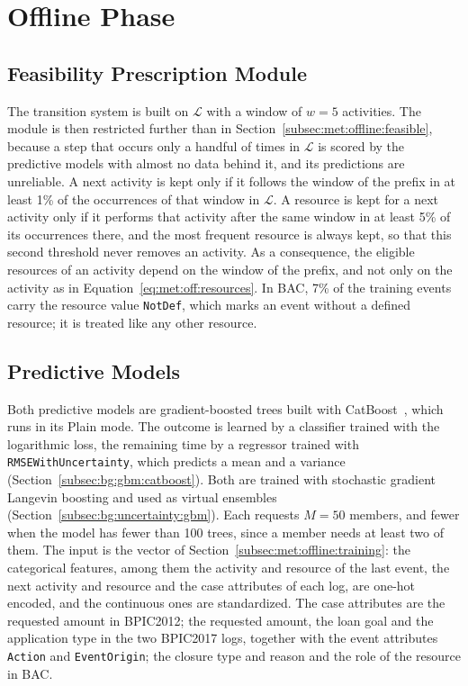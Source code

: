 \section{Offline Phase}
\label{sec:ev:offline}

\subsection{Feasibility Prescription Module}
\label{subsec:ev:off:feasible}
The transition system is built on $\mathcal{L}$ with a window of $w = 5$
activities. The module is then restricted further than in
Section~\ref{subsec:met:offline:feasible}, because a step that occurs only a
handful of times in $\mathcal{L}$ is scored by the predictive models with
almost no data behind it, and its predictions are unreliable. A next
activity is kept only if it follows the window of the prefix in at least 1\%
of the occurrences of that window in $\mathcal{L}$. A resource is kept for a
next activity only if it performs that activity after the same window in at
least 5\% of its occurrences there, and the most frequent resource is always
kept, so that this second threshold never removes an activity. As a
consequence, the eligible resources of an activity depend on the window of
the prefix, and not only on the activity as in
Equation~\eqref{eq:met:off:resources}. In BAC, 7\% of the training events
carry the resource value \texttt{NotDef}, which marks an event without a
defined resource; it is treated like any other resource.

\subsection{Predictive Models}
\label{subsec:ev:off:models}
Both predictive models are gradient-boosted trees built with
CatBoost~\cite{prokhorenkova2018}, which runs in its Plain mode. The outcome
is learned by a classifier trained with the logarithmic loss, the remaining
time by a regressor trained with \texttt{RMSEWithUncertainty}, which predicts
a mean and a variance (Section~\ref{subsec:bg:gbm:catboost}). Both are
trained with stochastic gradient Langevin boosting and used as virtual
ensembles (Section~\ref{subsec:bg:uncertainty:gbm}). Each requests $M = 50$
members, and fewer when the model has fewer than 100 trees, since a member
needs at least two of them. The input is the vector of
Section~\ref{subsec:met:offline:training}: the categorical features, among
them the activity and resource of the last event, the next activity and
resource and the case attributes of each log, are one-hot encoded, and the
continuous ones are standardized. The case attributes are the requested
amount in BPIC2012; the requested amount, the loan goal and the application
type in the two BPIC2017 logs, together with the event attributes
\texttt{Action} and \texttt{EventOrigin}; the closure type and reason and the
role of the resource in BAC.

